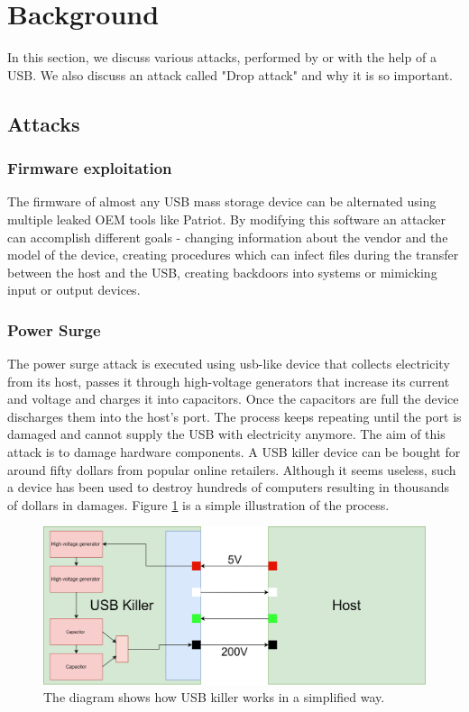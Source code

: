 \documentclass[sigconf]{acmart}
\begin{document}
\section{Background}
\par \quad In this section, we discuss various attacks, performed by or with the help of a USB. We also discuss an attack called "Drop attack" and why it is so important.

\subsection{Attacks}
\subsubsection{Firmware exploitation}
\par \quad The firmware of almost any USB mass storage device can be alternated using multiple leaked OEM tools like Patriot. By modifying this software an attacker can accomplish different goals - changing information about the vendor and the model of the device, creating procedures which can infect files during the transfer between the host and the USB, creating backdoors into systems or mimicking input or output devices.

\subsubsection{Power Surge}
\par \quad The power surge attack is executed using usb-like device that collects electricity from its host, passes it through high-voltage generators that increase its current and voltage and charges it into capacitors. Once the capacitors are full the device discharges them into the host's port. The process keeps repeating until the port is damaged and cannot supply the USB with electricity anymore. The aim of this attack is to damage hardware components. A USB killer device can be bought for around fifty dollars from popular online retailers. Although it seems useless, such a device has been used to destroy hundreds of computers resulting in thousands of dollars in damages. 
Figure \ref{fig:usb_killer_diagram} is a simple illustration of the process.

 \begin{figure}[htp]
    \centering
    \includegraphics[width=\linewidth]{images/usb_killer_diagram.png}
    \caption{The diagram shows how USB killer works in a simplified way.}
    \label{fig:usb_killer_diagram}
\end{figure}
\end{document}
